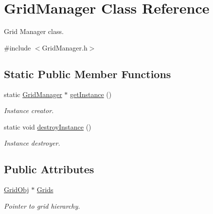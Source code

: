 \hypertarget{class_grid_manager}{}\section{Grid\+Manager Class Reference}
\label{class_grid_manager}


Grid Manager class.  




{\ttfamily \#include $<$Grid\+Manager.\+h$>$}

\subsection*{Static Public Member Functions}
\begin{DoxyCompactItemize}
\item 
static \hyperlink{class_grid_manager}{Grid\+Manager} $\ast$ \hyperlink{class_grid_manager_ad0bcf6940cee852f8ee35d9e41e0b26a}{get\+Instance} ()
\begin{DoxyCompactList}\small\item\em Instance creator. \end{DoxyCompactList}\item 
static void \hyperlink{class_grid_manager_a57340bdae9b742feed11f3c34f040033}{destroy\+Instance} ()
\begin{DoxyCompactList}\small\item\em Instance destroyer. \end{DoxyCompactList}\end{DoxyCompactItemize}
\subsection*{Public Attributes}
\begin{DoxyCompactItemize}
\item 
\hyperlink{class_grid_obj}{Grid\+Obj} $\ast$ \hyperlink{class_grid_manager_a434defbaec1448b17cc62cc8b4e5ba11}{Grids}
\begin{DoxyCompactList}\small\item\em Pointer to grid hierarchy. \end{DoxyCompactList}\end{DoxyCompactItemize}
